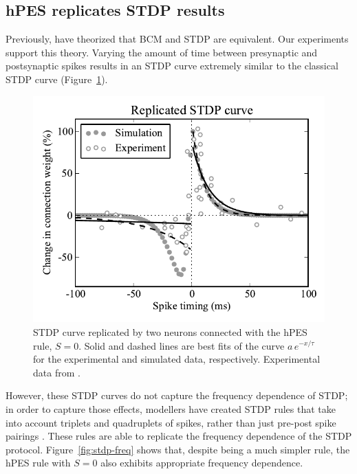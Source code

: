 \documentclass[10pt,letterpaper]{article}
\begin{document}
\subsection{hPES replicates STDP results}

Previously, 
have theorized that BCM and STDP are equivalent.
Our experiments support this theory.
Varying the amount of time between presynaptic
and postsynaptic spikes results in an STDP curve
extremely similar to the classical
 STDP curve
(Figure~\ref{fig:stdp-curve}).

\begin{figure}[ht]
\begin{center}
\includegraphics[width=\columnwidth]{fig1-bcm-stdp}
\end{center}
\caption{STDP curve replicated by two neurons
  connected with the hPES rule, $S = 0$.
  Solid and dashed lines are best fits of the curve
  $a\,e^{-x / \tau}$ for the experimental
  and simulated data, respectively.
  Experimental data from \cite{Bi2001}.}
\label{fig:stdp-curve}
\end{figure}

However, these STDP curves do not capture
the frequency dependence of STDP;
in order to capture those effects,
modellers have created STDP rules that take into
account triplets and quadruplets of spikes,
rather than just pre-post spike pairings \cite{Pfister2006}.
These rules are able to replicate
the frequency dependence of the STDP protocol.
Figure~\ref{fig:stdp-freq} shows that,
despite being a much simpler rule,
the hPES rule with $S = 0$
also exhibits appropriate frequency dependence.
\end{document}
